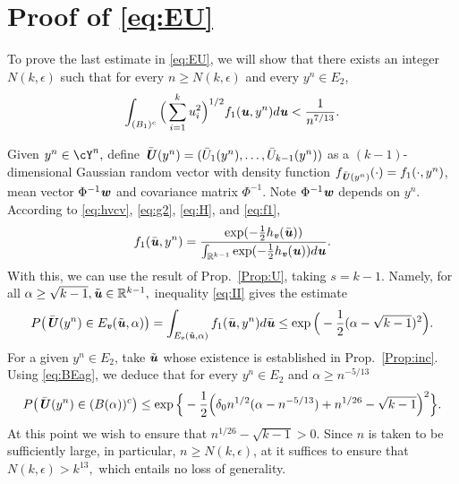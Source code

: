 \documentclass[11pt,onecolumn]{IEEEtran}
\def\mathbi#1{{\textbf{\textit #1}}}
\begin{document}
\section{Proof of \eqref{eq:EU}}\label{ap:f1}
To prove the last estimate in \eqref{eq:EU}, we will show that there exists an integer $N(k,\epsilon)$ such that for every $n\ge N(k,\epsilon)$ and every $y^n \in E_2$,
  \begin{equation}\label{eq:F}
 \int_{ (B_1)^c} \Big(\sum_{i=1}^k u_i^2 \Big)^{1/2} f_1(\mathbi{u},y^n) d\mathbi{u} 
<  \frac{1}{n^{7/13}}.
  \end{equation}


Given $y^n\in \cY^n,$ define $\bar{\mathbi{U}}(y^n)=(\bar{U}_1(y^n),\dots,\bar{U}_{k-1}(y^n)) $ as a $(k-1)$-dimensional Gaussian random vector with density function $f_{\bar{\mathbi{U}}(y^n)}(\cdot)=  f_1(\cdot,y^n)$, mean vector $\Phi^{-1}\mathbi{w}$ and covariance matrix $\Phi^{-1}.$
Note $\Phi^{-1}\mathbi{w}$ depends on $y^n$.
   According to \eqref{eq:hvcv}, \eqref{eq:g2}, \eqref{eq:H}, and \eqref{eq:f1},
   $$
f_1(\bar{\mathbi{u}},y^n)=
\frac{ \exp(-\frac{1}{2}h_{\mathbi{v}}(\bar{\mathbi{u}} )) }{\int_{ \mathbb{R}^{k-1}} \exp(-\frac{1}{2} h_{\mathbi{v}}(\mathbi{u})) d\mathbi{u}}.
  $$
With this, we can use the result of Prop.~\ref{Prop:U}, taking $s=k-1.$ Namely, for all $\alpha\ge \sqrt{k-1}, 
\tilde{\mathbi{u}}\in {\mathbb{R}}^{k-1},$ inequality \eqref{eq:II} gives the estimate
$$
P  \big( \bar{\mathbi{U}}(y^n) \in E_{\mathbi{v}}(\tilde{\mathbi{u}}, \alpha)  \big) =
\int_{ E_{\mathbi{v}}(\tilde{\mathbi{u}}, \alpha)} f_1(\bar{\mathbi{u}},y^n) d\bar{\mathbi{u}}
\le \exp\Big(-\frac{1}{2} (\alpha-\sqrt{k-1})^2 \Big) .$$
For a given $y^n\in E_2$, take $\tilde{\mathbi{u}}$ whose existence is established in Prop.~\ref{Prop:inc}. Using \eqref{eq:BEag}, we deduce that for every $y^n \in E_2$ and $ \alpha \ge n^{-5/13}$
   \begin{equation}\label{eq:PUB}
P  \big(\bar{\mathbi{U}}(y^n) \in (B(\alpha))^c  \big) \le
\exp\Big\{-\frac{1}{2} \Big( \delta_0 n^{1/2} (\alpha - n^{-5/13} ) + n^{1/26}-\sqrt{k-1} \Big)^2 \Big\} .
    \end{equation}
At this point we wish to ensure that $n^{1/26}-\sqrt{k-1}>0$. Since $n$ is taken to be sufficiently large, in particular,
$n\ge N(k,\epsilon)$, at it suffices to ensure that  $N(k,\epsilon)>k^{13},$ which entails no loss of generality.
\end{document}
